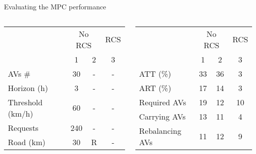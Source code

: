 \begin{frame}{Evaluating the MPC performance}
	\begin{columns}
		\begin{column}{0.4\textwidth}
			\begin{table}
				\begin{tabular}{ |l| c|c|c|}
					\cline{2-4}
					\multicolumn{1}{c|}{}&\multicolumn{2}{c|}{No RCS}& RCS\\
					\cline{2-4}
					\multicolumn{1}{c|}{}& 1 &  2&3\\
					\cline{1-4}
					AVs \#& 30&-&-\\
					Horizon (h) & 3 &-& -\\
					Threshold (km/h) & 60&-&-\\
					Requests & 240&-&-\\
					Road (km) & 30&R&-\\
				\end{tabular}
			\end{table}
		\end{column}
		\begin{column}{0.4\textwidth}
			\begin{table}
				\begin{tabular}{ |p{2.9cm}|c|c|c|}
					\cline{2-4}
					\multicolumn{1}{c|}{}&\multicolumn{2}{c|}{No RCS}& RCS\\
					\cline{2-4}
					\multicolumn{1}{c|}{}& 1 &  2&3\\
					\cline{1-4}
					ATT	(\%)		&33&36& 3\\
					ART	(\%)		&17&14 &3\\
					Required AVs			&19&12& 10\\
					Carrying AVs			&13&11&4\\
					Rebalancing AVs			&11&12 &9\\
				\end{tabular}
			\end{table}
		\end{column}
	\end{columns}
\end{frame}


